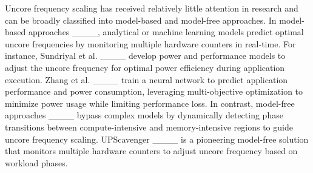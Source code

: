 Uncore frequency scaling has received relatively little attention in research and can be broadly classified into model-based and model-free approaches. In model-based approaches ____, analytical or machine learning models predict optimal uncore frequencies by monitoring multiple hardware counters in real-time. For instance, Sundriyal et al. ____ develop power and performance models to adjust the uncore frequency for optimal power efficiency during application execution. Zhang et al. ____ train a neural network to predict application performance and power consumption, leveraging multi-objective optimization to minimize power usage while limiting performance loss.
In contrast, model-free approaches ____ bypass complex models by dynamically detecting phase transitions between compute-intensive and memory-intensive regions to guide uncore frequency scaling. UPScavenger ____ is a pioneering model-free solution that monitors multiple hardware counters to adjust uncore frequency based on workload phases.
